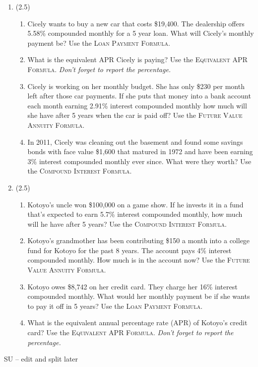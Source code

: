 \documentclass[12pt]{article}
\begin{document}
\begin{enumerate}
 \item (2.5)   \begin{enumerate} 
\item Cicely wants to buy a new car that costs \$19,400.  The dealership offers 5.58\% compounded monthly for a 5 year loan.  What will Cicely's monthly payment be? Use the \textsc{Loan Payment Formula}.  
\item What is the equivalent APR Cicely  is paying?  Use the \textsc{Equivalent APR Formula}.   \emph{Don't forget to report the percentage.}
\item Cicely is working on her monthly budget.  She has only \$230 per month left after those car payments.  If she puts that money into a bank account each month earning 2.91\% interest compounded monthly how much will she have after 5 years when the car is paid off?  Use the \textsc{Future Value Annuity Formula}.   
\item In 2011, Cicely was cleaning out the basement and found some savings bonds with face value \$1,600 that matured in 1972 and have been earning 3\% interest compounded monthly ever since.  What were they worth? Use the \textsc{Compound Interest Formula}.  
\end{enumerate}
 
 \item  (2.5)  \begin{enumerate} 
\item Kotoyo's uncle won \$100,000 on a game show.  If he invests it in a fund that's expected to earn 5.7\% interest compounded monthly, how much will he have after 5 years? Use the \textsc{Compound Interest Formula}. 
\item Kotoyo's grandmother has been contributing \$150 a month into a college fund for Kotoyo for the past 8 years.  The account pays 4\% interest compounded monthly.  How much is in the account now? Use the \textsc{Future Value Annuity Formula}.   
\item Kotoyo owes \$8,742 on her credit card.  They charge her 16\% interest compounded monthly.  What would her monthly payment be if she wants to pay it off in 5 years? Use the \textsc{Loan Payment Formula}.  
\item What is the equivalent annual percentage rate (APR) of Kotoyo's credit card? Use the \textsc{Equivalent APR Formula}.  \emph{Don't forget to report the percentage.}
\end{enumerate}


\end{enumerate}

SU -- edit and split later
\end{document}

